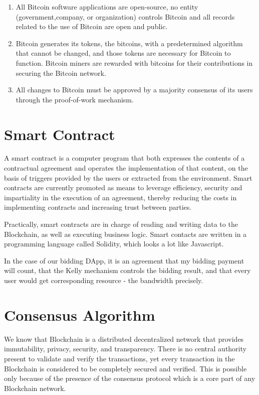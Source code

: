 \begin{enumerate}
\item All Bitcoin software applications are open-source, no entity (government,company, or organization) controls Bitcoin and all records related to the use of Bitcoin are open and public.
\item Bitcoin generates its tokens, the bitcoins, with a predetermined algorithm that cannot be changed, and those tokens are necessary for Bitcoin to function. Bitcoin miners are rewarded with bitcoins for their contributions in securing the Bitcoin network.
\item All changes to Bitcoin must be approved by a majority consensus of its users through the proof-of-work mechanism.
\end{enumerate}

\section{Smart Contract}

A smart contract is a computer program that both expresses the contents of a contractual agreement and operates the implementation of that content, on the basis of triggers provided by the users or extracted from the environment. Smart contracts are currently promoted as means to leverage efficiency, security and impartiality in the execution of an agreement, thereby reducing the costs in implementing contracts and increasing trust between parties.

Practically, smart contracts are in charge of reading and writing data to the Blockchain, as well as executing business logic. Smart contacts are written in a programming language called Solidity, which looks a lot like Javascript.

In the case of our bidding DApp, it is an agreement that my bidding payment will count, that the Kelly mechanism controls the bidding result, and that every user would get corresponding resource - the bandwidth precisely.

\section{Consensus Algorithm}

We know that Blockchain is a distributed decentralized network that provides immutability, privacy, security, and transparency. There is no central authority present to validate and verify the transactions, yet every transaction in the Blockchain is considered to be completely secured and verified. This is possible only because of the presence of the consensus protocol which is a core part of any Blockchain network. 

